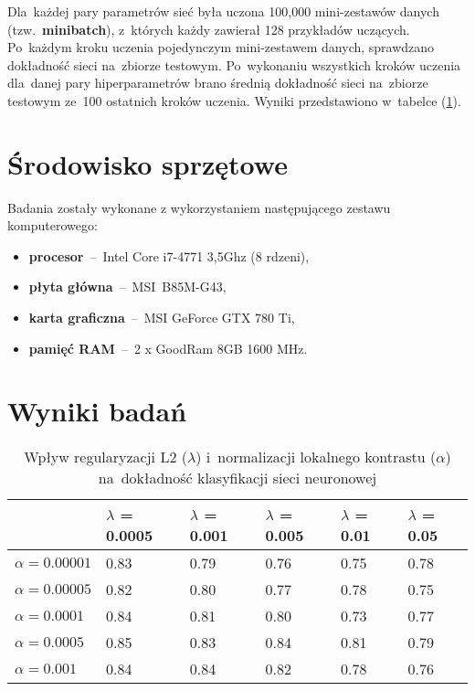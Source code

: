 Dla~każdej pary parametrów sieć była uczona 100,000 mini-zestawów danych (tzw.~\textbf{minibatch}), z~których
każdy zawierał 128 przykładów uczących. Po~każdym kroku uczenia pojedynczym mini-zestawem danych, sprawdzano
dokładność sieci na~zbiorze testowym. Po~wykonaniu wszystkich kroków uczenia dla~danej pary hiperparametrów
brano średnią dokładność sieci na~zbiorze testowym ze~100 ostatnich kroków uczenia. Wyniki przedstawiono w~tabelce
(\ref{table:wyniki1}).

\section{Środowisko sprzętowe}
Badania zostały wykonane z wykorzystaniem następującego zestawu komputerowego:
\begin{itemize}
    \item \textbf{procesor}~--~Intel Core i7-4771 3,5Ghz (8 rdzeni),
    \item \textbf{płyta główna}~--~MSI~B85M-G43,
    \item \textbf{karta graficzna}~--~MSI GeForce GTX 780 Ti,
    \item \textbf{pamięć RAM}~--~2 x GoodRam 8GB 1600 MHz.
\end{itemize}

\section{Wyniki badań}
\begin{table}[H]
    \centering
    \begin{tabular}{|l|l|l|l|l|l|}
      \hline
                       & $\lambda$ = 0.0005 & $\lambda$ = 0.001 & $\lambda$ = 0.005 & $\lambda$ = 0.01 & $\lambda$ = 0.05 \\
      \hline
      $\alpha=0.00001$ & 0.83 & 0.79 & 0.76 & 0.75 & 0.78 \\
      \hline
      $\alpha=0.00005$ & 0.82 & 0.80 & 0.77 & 0.78 & 0.75 \\
      \hline
      $\alpha=0.0001$  & 0.84 & 0.81 & 0.80 & 0.73 & 0.77 \\
      \hline
      $\alpha=0.0005$  & 0.85 & 0.83 & 0.84 & 0.81 & 0.79 \\
      \hline
      $\alpha=0.001$   & 0.84 & 0.84 & 0.82 & 0.78 & 0.76 \\
      \hline
    \end{tabular}
    \caption{Wpływ regularyzacji L2 ($\lambda$) i~normalizacji lokalnego kontrastu ($\alpha$) na~dokładność klasyfikacji
    sieci neuronowej}
    \label{table:wyniki1}
\end{table}

